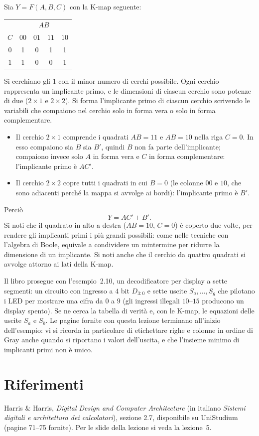 \documentclass[11pt,a4paper]{article}
\begin{document}
\begin{esempio}
Sia $Y = F(A,B,C)$ con la K-map seguente:
\begin{center}
\begin{tabular}{c|cccc}
 & \multicolumn{4}{c}{$AB$}\\
$C$ & $00$ & $01$ & $11$ & $10$ \\
\midrule
$0$ & 1 & 0 & 1 & 1 \\
$1$ & 1 & 0 & 0 & 1 \\
\end{tabular}
\end{center}
Si cerchiano gli $1$ con il minor numero di cerchi possibile. Ogni cerchio rappresenta un implicante primo, e le dimensioni di ciascun cerchio sono potenze di due ($2 \times 1$ e $2 \times 2$). Si forma l'implicante primo di ciascun cerchio scrivendo le variabili che compaiono nel cerchio solo in forma vera o solo in forma complementare.

\begin{itemize}
    \item Il cerchio $2 \times 1$ comprende i quadrati $AB = 11$ e $AB = 10$ nella riga $C = 0$. In esso compaiono sia $B$ sia $B'$, quindi $B$ non fa parte dell'implicante; compaiono invece solo $A$ in forma vera e $C$ in forma complementare: l'implicante primo è $AC'$.
    \item Il cerchio $2 \times 2$ copre tutti i quadrati in cui $B = 0$ (le colonne $00$ e $10$, che sono adiacenti perché la mappa si avvolge ai bordi): l'implicante primo è $B'$.
\end{itemize}
Perciò
\[
Y = AC' + B'.
\]
Si noti che il quadrato in alto a destra ($AB = 10$, $C = 0$) è coperto due volte, per rendere gli implicanti primi i più grandi possibili: come nelle tecniche con l'algebra di Boole, equivale a condividere un mintermine per ridurre la dimensione di un implicante. Si noti anche che il cerchio da quattro quadrati si avvolge attorno ai lati della K-map.
\end{esempio}

\begin{osservazione}
Il libro prosegue con l'esempio~2.10, un decodificatore per display a sette segmenti: un circuito con ingresso a $4$ bit $D_{3:0}$ e sette uscite $S_a, \dots, S_g$ che pilotano i LED per mostrare una cifra da $0$ a $9$ (gli ingressi illegali $10$--$15$ producono un display spento). Se ne cerca la tabella di verità e, con le K-map, le equazioni delle uscite $S_a$ e $S_b$. Le pagine fornite con questa lezione terminano all'inizio dell'esempio: vi si ricorda in particolare di etichettare righe e colonne in ordine di Gray anche quando si riportano i valori dell'uscita, e che l'insieme minimo di implicanti primi non è unico.
\end{osservazione}

\section{Riferimenti}

Harris \& Harris, \emph{Digital Design and Computer Architecture} (in italiano \emph{Sistemi digitali e architettura dei calcolatori}), sezione 2.7, disponibile su UniStudium (pagine 71--75 fornite). Per le slide della lezione si veda la lezione~5.
\end{document}
